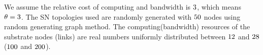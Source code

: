 We assume the relative cost of computing and bandwidth is $3$\cite{armbrust2009above,yu2010survivable}, which means $\theta=3$. The SN topologies used are randomly generated with $50$ nodes using random generating graph method. The computing(bandwidth) resources of the substrate nodes (links) are real numbers uniformly distributed between $12$ and $28$ ($100$ and $200$).




